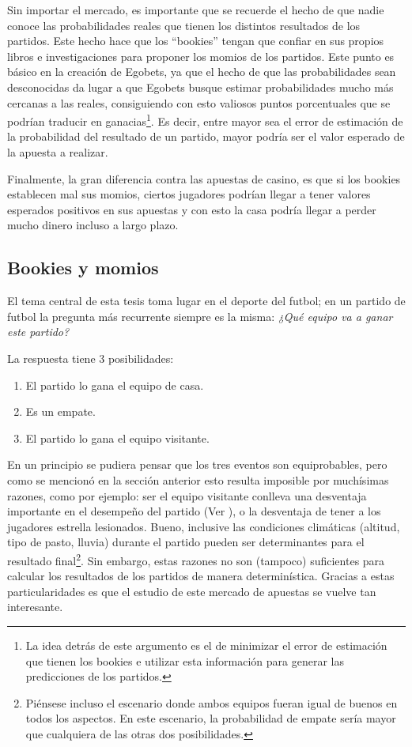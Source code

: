 Sin importar el mercado, es importante que se recuerde el hecho de que nadie conoce las probabilidades reales que tienen los distintos resultados de los partidos. Este hecho hace que los ``bookies'' tengan que confiar en sus propios libros e investigaciones para proponer los momios de los partidos. Este punto es básico en la creación de Egobets, ya que el hecho de que las probabilidades sean desconocidas da lugar a que Egobets busque estimar probabilidades mucho más cercanas a las reales, consiguiendo con esto valiosos puntos porcentuales que se podrían traducir en ganacias\footnote{La idea detrás de este argumento es el de minimizar el error de estimación que tienen los bookies e utilizar esta información para generar las predicciones de los partidos.}. Es decir, entre mayor sea el error de estimación de la probabilidad del resultado de un partido, mayor podría ser el valor esperado de la apuesta a realizar. 

Finalmente, la gran diferencia contra las apuestas de casino, es que si los bookies establecen mal sus momios, ciertos jugadores podrían llegar a tener valores esperados positivos en sus apuestas y con esto la casa podría llegar a perder mucho dinero incluso a largo plazo.



\subsection{Bookies y momios}

El tema central de esta tesis toma lugar en el deporte del futbol; en un partido de futbol la pregunta más recurrente siempre es la misma: \emph{¿Qué equipo va a ganar este partido?}

La respuesta tiene $3$ posibilidades:
\begin{enumerate}
	\item El partido lo gana el equipo de casa.
	\item Es un empate.
	\item El partido lo gana el equipo visitante.
\end{enumerate}
En un principio se pudiera pensar que los tres eventos son equiprobables, pero como se mencionó en la sección anterior esto resulta imposible por muchísimas razones, como por ejemplo: ser el equipo visitante conlleva una desventaja importante en el desempeño del partido (Ver \cite{roffe2007crisis}), o la desventaja de tener a los jugadores estrella lesionados. Bueno, inclusive las condiciones climáticas (altitud, tipo de pasto, lluvia) durante el partido pueden ser determinantes para el resultado final\footnote{Piénsese incluso el escenario donde ambos equipos fueran igual de buenos en todos los aspectos. En este escenario, la probabilidad de empate sería mayor que cualquiera de las otras dos posibilidades.}. Sin embargo, estas razones no son (tampoco) suficientes para calcular los resultados de los partidos de manera determinística. Gracias a estas particularidades es que el estudio de este mercado de apuestas se vuelve tan interesante.

